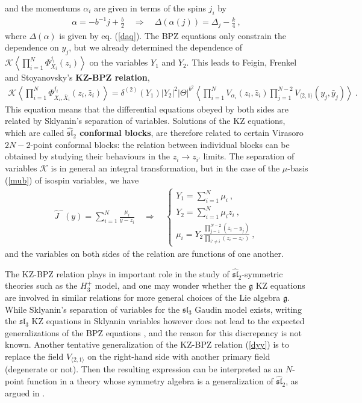 \documentclass[12pt,a4paper,notitlepage]{report}
\newcommand \la {\left\langle}
\newcommand \ra {\right\rangle}
\newcommand \bla {\left\{\begin{array}{l} }
\newcommand \ela {\end{array}\right. }
\numberwithin{equation}{section}
\theoremstyle{break}
\begin{document}
and the momentums $\alpha_i$ are given in terms of the spins $j_i$ by 
\begin{align}
 \boxed{\alpha = -b^{-1}j+\frac{b}{2}}\quad \Rightarrow \quad \boxed{\Delta(\alpha(j)) = \Delta_j-\frac{k}{4}}\ ,
\label{aj}
\end{align}
where $\Delta(\alpha)$ is given by eq. (\ref{daq}). The BPZ equations only constrain the dependence on $y_j$, but we already determined the dependence of  
$\mathcal{K}\la \prod_{i=1}^N \Phi^{j_i}_{X_i}(z_i)\ra$ on the variables $Y_1$ and $Y_2$. This leads to Feigin, Frenkel and Stoyanovsky's \textbf{\boldmath KZ-BPZ relation},
\begin{align}
 \boxed{ \mathcal{K}\la \prod_{i=1}^N \Phi^{j_i}_{X_i,\bar{X}_i}(z_i,\bar{z}_i)\ra = \delta^{(2)}(Y_1) |Y_2|^2 |\Theta|^{b^2} \la \prod_{i=1}^N V_{\alpha_i}(z_i,\bar{z}_i)\prod_{j=1}^{N-2}V_{\langle 2,1\rangle}(y_j,\bar{y}_j)\ra}\ .
\label{dyy}
\end{align}
This equation means that the differential equations obeyed by both sides are related by Sklyanin's separation of variables. 
Solutions of the KZ equations, which are called \textbf{\boldmath $\widehat{\mathfrak{sl}}_2$ conformal blocks}, are therefore related to certain Virasoro $2N-2$-point conformal blocks: the relation between individual blocks can be obtained by studying their behaviours in the $z_i\rightarrow z_{i'}$ limits. The separation of variables $\mathcal{K}$ is in general an integral transformation, but in the case of the $\mu$-basis (\ref{mub}) of isospin variables, we have 
\begin{align}
 \hat{J}^-(y) = \sum_{i=1}^N \frac{\mu_i}{y-z_i} \quad \Rightarrow \quad \bla Y_1 =\sum_{i=1}^N \mu_i\ , \\ Y_2 = \sum_{i=1}^N \mu_i z_i\ , \\ \mu_i = Y_2\frac{\prod_{j=1}^{N-2}(z_i-y_j)}{\prod_{i'\neq i}(z_i-z_{i'})}\ ,\ela
\label{my}
\end{align}
and the variables on both sides of the relation are functions of one another. 

The KZ-BPZ relation plays in important role in the study of $\widehat{\mathfrak{sl}}_2$-symmetric theories such as the $H_3^+$ model, and one may wonder whether the $\mathfrak{g}$ KZ equations are involved in similar relations for more general choices of the Lie algebra $\mathfrak{g}$. While Sklyanin's separation of variables for the $\mathfrak{sl}_3$ Gaudin model exists, writing the $\mathfrak{sl}_3$ KZ equations in Sklyanin variables however does not lead to the expected generalizations of the BPZ equations \cite{rib08b}, and the reason for this discrepancy is not known. 
Another tentative generalization of the KZ-BPZ relation (\ref{dyy}) is to replace the field $V_{\langle 2,1\rangle}$ on the right-hand side with another primary field (degenerate or not). Then the resulting expression can be interpreted as an $N$-point function in a theory whose symmetry algebra is a generalization of $\widehat{\mathfrak{sl}}_2$, as argued in \cite{rib08}.
\end{document}

